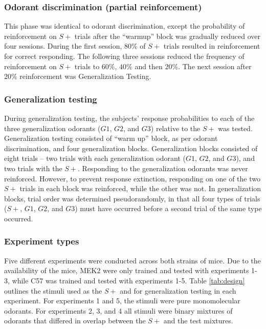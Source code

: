 \subsubsection*{Odorant discrimination (partial reinforcement)}
\label{sec:methods_discrimination}
This phase was identical to odorant discrimination, except the probability of reinforcement on $S+$ trials after the ``warmup'' block was gradually reduced over four sessions. During the first session, $80\%$ of $S+$ trials resulted in reinforcement for correct responding. The following three sessions reduced the frequency of reinforcement on $S+$ trials to $60\%$, $40\%$ and then $20\%$. The next session after $20\%$ reinforcement was Generalization Testing.

\subsubsection*{Generalization testing}
\label{sec:methods_training}
During generalization testing, the subjects' response probabilities to each of the three generalization odorants ($G1$, $G2$, and $G3$) relative to the $S+$ was tested. Generalization testing consisted of ``warm up'' block, as per odorant discrimination, and four generalization blocks. Generalization blocks consisted of eight trials – two trials with each generalization odorant ($G1$, $G2$, and $G3$), and two trials with the $S+$. Responding to the generalization odorants was never reinforced. However, to prevent response extinction, responding on one of the two $S+$ trials in each block was reinforced, while the other was not. In generalization blocks, trial order was determined pseudorandomly, in that all four types of trials ($S+$, $G1$, $G2$, and $G3$) must have occurred before a second trial of the same type occurred.

\subsubsection*{Experiment types}
\label{sec:methods_experiment_types}
Five different experiments were conducted across both strains of mice. Due to the availability of the mice, MEK2 were only trained and tested with experiments 1-3, while C57 was trained and tested with experiments 1-5.  Table \ref{tab:design} outlines the stimuli used as the $S+$ and for generalization testing in each experiment. For experiments 1 and 5, the stimuli were pure monomolecular odorants. For experiments 2, 3, and 4 all stimuli were binary mixtures of odorants that differed in overlap between the $S+$ and the test mixtures. 


